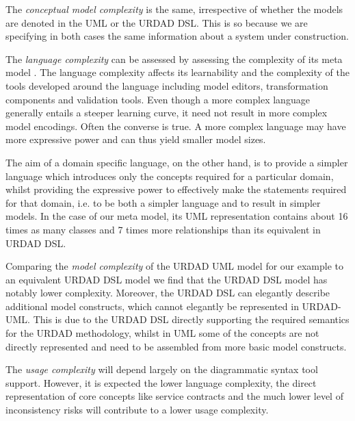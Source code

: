 The \emph{conceptual model complexity} is the same, irrespective  of whether the models are denoted in the UML or the URDAD DSL. This is so because we are specifying in both cases the same information about a system under construction.

The \emph{language complexity} can be assessed by assessing the complexity of its meta model \cite{mohagheghi_evaluating_2007}. The language complexity affects its learnability and the complexity  of the tools developed around the language including model editors, transformation components and validation tools. Even though a more complex language generally entails a steeper learning curve, it need not result in more complex model encodings. Often the converse is true. A more complex language may have more expressive power and can thus yield smaller model sizes. 

The aim of a domain specific language, on the other hand, is to provide a simpler language which introduces only the concepts required for a particular domain, whilst providing the expressive power to effectively make the statements required for that domain, i.e. to be both a simpler language and to result in simpler models. In the case of our meta model, its UML representation contains about 16 times as many classes and 7 times more relationships than its equivalent in URDAD DSL. 

Comparing the \emph{model complexity} of the URDAD UML model for our example to an equivalent URDAD DSL model we find that the URDAD DSL model has notably lower complexity. Moreover, the URDAD DSL can elegantly describe additional model constructs, which cannot elegantly be represented in URDAD-UML. This is due to the URDAD DSL directly supporting the required semantics for the URDAD methodology, whilst in UML some of the concepts are not directly represented and need to be assembled from more basic model constructs.

The \emph{usage complexity} will depend largely on the diagrammatic syntax tool support. However, it is expected the lower language complexity, the direct representation of core concepts like service contracts and the much lower level of inconsistency risks will contribute to a lower usage complexity.